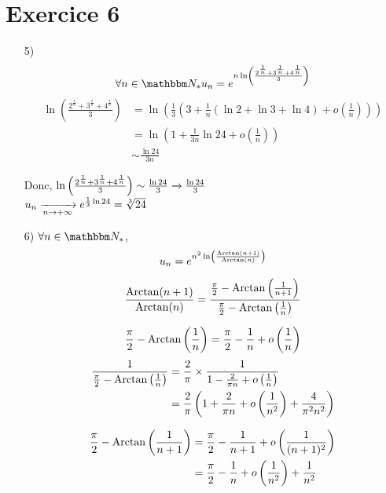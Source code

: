 \part{Exercice 6}
\begin{itemize}
	\item[5)]
		\[
			\forall n \in \N_* u_n = e^{n \ln\left( \frac{2^{\frac{1}{n}} + 3^{\frac{1}{n}} + 4^{\frac{1}{n}}}{3} \right) }
		\] 
		\begin{align*}
			\ln\left( \frac{2^{\frac{1}{n}} + 3^{\frac{1}{n}} + 4^{\frac{1}{n}}}{3} \right)
			&= \ln\left( \frac{1}{3}\left( 3 + \frac{1}{n}\left( \ln 2 + \ln 3 + \ln 4 \right) + o\left( \frac{1}{n}\right)  \right)  \right)  \\
			&= \ln\left( 1+\frac{1}{3n}\ln 24 + o\left( \frac{1}{n} \right)  \right)  \\
			&\sim \frac{\ln 24}{3n}
		\end{align*}

		Donc, $\ln\left( \frac{2^{\frac{1}{n}} + 3^{\frac{1}{n}} + 4^{\frac{1}{n}}}{3} \right) \sim \frac{\ln 24}{3} \xrightarrow[]{} \frac{\ln 24}{3}$\\
		$u_n\xrightarrow[n \to +\infty]{} e^{\frac{1}{3}\ln 24} = \sqrt[3]{24}$ 
	\item[6)]
		$\forall n \in \N_*$, \[
		u_n = e^{n^2\ln\left( \frac{\operatorname{Arctan}(n+1)}{\operatorname{Arctan}(n)} \right) }
		\] 

		\begin{align*}
			\frac{\operatorname{Arctan}(n+1)}{\operatorname{Arctan}(n)} = \frac{\frac{\pi}{2} - \operatorname{Arctan}\left( \frac{1}{n+1} \right)}{\frac{\pi}{2} - \operatorname{Arctan}\left( \frac{1}{n} \right) }
		\end{align*}

		\[
			\frac{\pi}{2} - \operatorname{Arctan}\left(\frac{1}{n}\right) = \frac{\pi}{2} - \frac{1}{n} + o\left( \frac{1}{n} \right) 
		\] 
		\begin{align*}
			\frac{1}{\frac{\pi}{2} - \operatorname{Arctan}\left( \frac{1}{n} \right)} &= \frac{2}{\pi} \times \frac{1}{1 - \frac{2}{\pi n} + o\left( \frac{1}{n} \right) } \\
			&= \frac{2}{\pi}\left( 1+\frac{2}{\pi n} + o\left( \frac{1}{n^2} \right) + \frac{4}{\pi^2n^2} \right)  \\
		\end{align*}

		\begin{align*}
			\frac{\pi}{2} - \operatorname{Arctan}\left( \frac{1}{n+1} \right)
			&= \frac{\pi}{2} - \frac{1}{n+1} + o\left( \frac{1}{(n+1)^2} \right)  \\
			&= \frac{\pi}{2} - \frac{1}{n} +o\left( \frac{1}{n^2} \right)  + \frac{1}{n^2} \\
		\end{align*}


\end{itemize}
